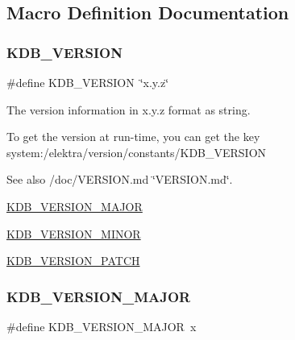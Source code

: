 \subsection{Macro Definition Documentation}
\mbox{\label{group__kdb_ga2f8953fe5f9f28db54b3ef678ebf40d7}} 
\subsubsection{\texorpdfstring{K\+D\+B\+\_\+\+V\+E\+R\+S\+I\+ON}{KDB\_VERSION}}
{\footnotesize\ttfamily \#define K\+D\+B\+\_\+\+V\+E\+R\+S\+I\+ON~\char`\"{}x.\+y.\+z\char`\"{}}



The version information in x.\+y.\+z format as string. 

To get the version at run-\/time, you can get the key system\+:/elektra/version/constants/\+K\+D\+B\+\_\+\+V\+E\+R\+S\+I\+ON

\begin{DoxySeeAlso}{See also}
/doc/\+V\+E\+R\+S\+I\+ON.md \char`\"{}\+V\+E\+R\+S\+I\+O\+N.\+md\char`\"{}. 

\hyperlink{group__kdb_ga57ee4c9e19daac86934e62441f8755fc}{K\+D\+B\+\_\+\+V\+E\+R\+S\+I\+O\+N\+\_\+\+M\+A\+J\+OR} 

\hyperlink{group__kdb_ga3407dacaacc5d83e2046db872b2408a9}{K\+D\+B\+\_\+\+V\+E\+R\+S\+I\+O\+N\+\_\+\+M\+I\+N\+OR} 

\hyperlink{group__kdb_gaa67fb397397981929b24f52ed2a2d92d}{K\+D\+B\+\_\+\+V\+E\+R\+S\+I\+O\+N\+\_\+\+P\+A\+T\+CH} 
\end{DoxySeeAlso}
\mbox{\label{group__kdb_ga57ee4c9e19daac86934e62441f8755fc}} 
\subsubsection{\texorpdfstring{K\+D\+B\+\_\+\+V\+E\+R\+S\+I\+O\+N\+\_\+\+M\+A\+J\+OR}{KDB\_VERSION\_MAJOR}}
{\footnotesize\ttfamily \#define K\+D\+B\+\_\+\+V\+E\+R\+S\+I\+O\+N\+\_\+\+M\+A\+J\+OR~x}




